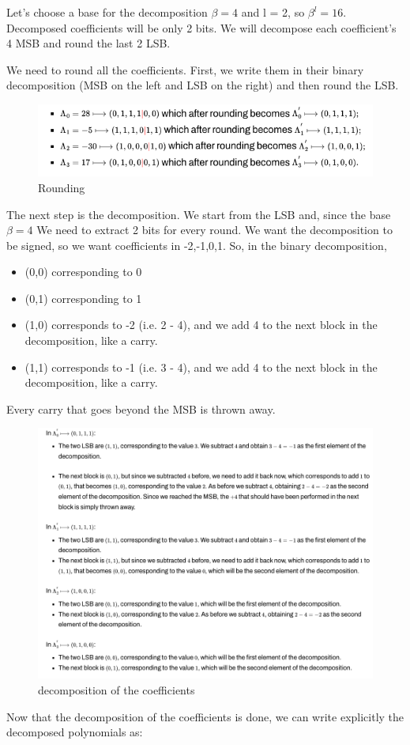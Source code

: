 \documentclass{techrep}
\theoremstyle{definition}
\theoremstyle{plain}
\begin{document}
Let's choose a base for the decomposition $\beta=4$ and l = 2, so $\beta^l=16$. Decomposed coefficients will be only 2 bits. We will decompose each coefficient's 4 MSB and round the last 2 LSB.

We need to round all the coefficients. First, we write them in their binary decomposition (MSB on the left and LSB on the right) and then round the LSB. 

	\begin{figure}[H]
		\centering
	\includegraphics[width=.9\columnwidth]{fig/rounding.png}
		\caption{Rounding}
		\label{fig:rounding}
	\end{figure}

The next step is the decomposition. We start from the LSB and, since the base $\beta = 4$
We need to extract 2 bits for every round. We want the decomposition to be signed, so we want coefficients in {-2,-1,0,1}. So, in the binary decomposition, 

\begin{itemize}
  \item (0,0) corresponding to 0
  \item (0,1) corresponding to 1
  \item (1,0) corresponds to -2 (i.e. 2 - 4), and we add 4 to the next block in the decomposition, like a carry.
  \item (1,1) corresponds to -1 (i.e. 3 - 4), and we add 4 to the next block in the decomposition, like a carry.
\end{itemize}

Every carry that goes beyond the MSB is thrown away. 

	\begin{figure}[H]
		\centering
	\includegraphics[width=1.1\columnwidth]{fig/lsb_rounding.png}
		\caption{decomposition of the coefficients}
		\label{fig:rounding_lsb}
	\end{figure}
Now that the decomposition of the coefficients is done, we can write explicitly the decomposed polynomials as:
\end{document}
